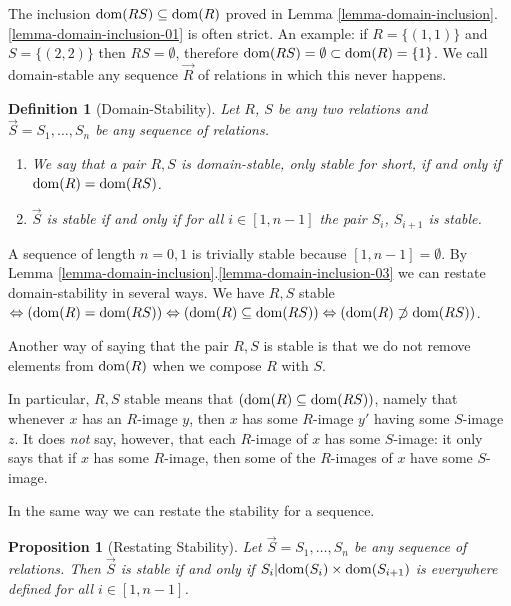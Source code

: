 \documentclass{lmcs}
\newtheorem{proposition}[theorem]{Proposition}
\newtheorem{definition}[theorem]{Definition}
\begin{document}
The inclusion ${\rm dom}(RS) \subseteq {\rm dom}(R)$ proved in
Lemma \ref{lemma-domain-inclusion}.\ref{lemma-domain-inclusion-01}
is often strict. An example: if $R = \{(1,1)\}$ and $S = \{(2,2)\}$ then $RS=\emptyset$,
therefore ${\rm dom}(RS) = \emptyset \subset {\rm dom}(R) = \{1\}$. 
We call domain-stable any sequence $\vec{R}$ of relations in which this never happens.
 
\begin{definition}[Domain-Stability]
Let $R$, $S$ be any two relations and $\vec{S}=S_1, \ldots, S_n$ be any sequence of relations. 
\begin{enumerate}

\item
We say that a pair $R, S$ is \emph{domain-stable}, only \emph{stable} for short, if 
and only if ${\rm dom}(R) = {\rm dom}(RS)$.

\item
$\vec{S}$ is stable if and only if for all $i \in [1,n-1]$
the pair $S_i$, $S_{i+1}$ is stable.

\end{enumerate} 
\end{definition}


A sequence of length $n=0,1$ is trivially stable because $[1,n-1] = \emptyset$.
By Lemma \ref{lemma-domain-inclusion}.\ref{lemma-domain-inclusion-03} we can
restate domain-stability in several ways. We have
$R,S$ stable $ \Leftrightarrow ({\rm dom}(R) = {\rm dom}(RS))  
  \Leftrightarrow  
({\rm dom}(R) \subseteq {\rm dom}(RS)) 
  \Leftrightarrow   
({\rm dom}(R) \not \supset  {\rm dom}(RS))
$.

Another way of saying that the pair $R,S$ is stable is that we do not remove elements
from ${\rm dom}(R)$ when we compose $R$ with $S$.

In particular, $R,S$ stable means that $({\rm dom}(R) \subseteq {\rm dom}(RS))$, 
namely that whenever $x$ has an $R$-image $y$, then $x$ has some
$R$-image $y'$ having some $S$-image $z$. It does \emph{not} say, however,
that each $R$-image of $x$ has some $S$-image: it only says that if $x$ has some
$R$-image, then some of the $R$-images of $x$ have some $S$-image. 

In the same way we can restate the stability for a sequence.

\begin{proposition}[Restating Stability]
Let $\vec{S}=S_1, \ldots, S_n$ be any sequence of relations. 
Then  $\vec{S}$ is stable if and only if $S_i {|} {\rm dom}(S_i) \times {\rm dom}(S_{i+1})$ 
is everywhere defined for all $i \in [1,n-1]$. 
\end{proposition}
\end{document}
